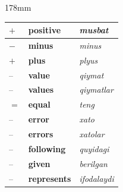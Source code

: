 \documentclass[a4paper]{article}
\begin{document}
\begin{textblock*}{178mm}
{\begin{tabular}{|>{\centering\arraybackslash}p{22mm}|p{68mm}|p{72mm}|}
\rowcolor{badge!18}
$+$ & \textbf{positive} & \textit{musbat} \\ \hline
$-$ & \textbf{minus} & \textit{minus} \\ \hline
\rowcolor{badge!18}
$+$ & \textbf{plus} & \textit{plyus} \\ \hline
-- & \textbf{value} & \textit{qiymat} \\ \hline
\rowcolor{badge!18}
-- & \textbf{values} & \textit{qiymatlar} \\ \hline
$=$ & \textbf{equal} & \textit{teng} \\ \hline
\rowcolor{badge!18}
-- & \textbf{error} & \textit{xato} \\ \hline
-- & \textbf{errors} & \textit{xatolar} \\ \hline
\rowcolor{badge!18}
-- & \textbf{following} & \textit{quyidagi} \\ \hline
-- & \textbf{given} & \textit{berilgan} \\ \hline
\rowcolor{badge!18}
-- & \textbf{represents} & \textit{ifodalaydi} \\ \hline
\end{tabular}
}
\end{textblock*}
\end{document}
